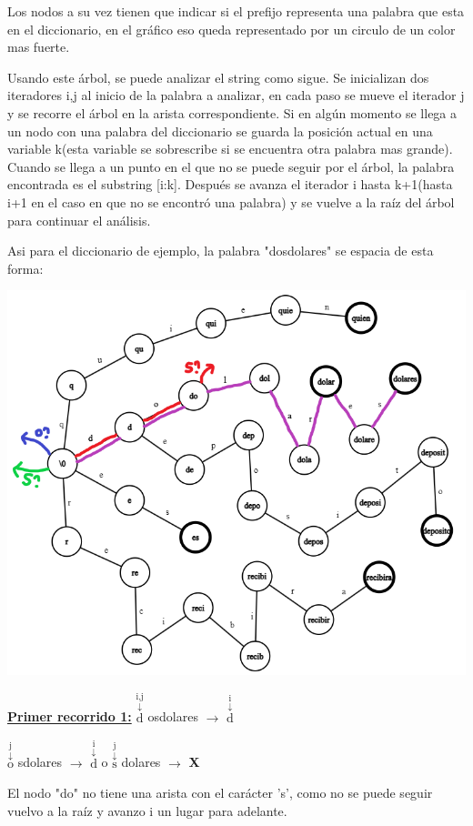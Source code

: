 \documentclass{article}
\newcommand{\flecha}[2] {
    \!\!$\overset{\text{#1}}{\overset{\downarrow}{\text{#2}}}$\!\!
}
\begin{document}
Los nodos a su vez tienen que indicar si el prefijo representa una palabra que esta en el diccionario, en el gráfico
eso queda representado por un circulo de un color mas fuerte.

Usando este árbol, se puede analizar el string como sigue. Se inicializan dos iteradores i,j al inicio de la palabra a analizar,
en cada paso se mueve el iterador j y se recorre el árbol en la arista correspondiente. Si en algún momento se llega a un nodo
con una palabra del diccionario se guarda la posición actual en una variable k(esta variable se sobrescribe si se encuentra otra
palabra mas grande). Cuando se llega a un punto en el que no se puede seguir por el árbol, la palabra encontrada es el substring
[i:k]. Después se avanza el iterador i hasta k+1(hasta i+1 en el caso en que no se encontró una palabra) y se vuelve a la raíz del 
árbol para continuar el análisis.

Asi para el diccionario de ejemplo, la palabra "dosdolares" se espacia de esta forma:

\begin{center}
\includegraphics[scale=0.4]{ejemplo_trie1.png}
\end{center}

{\color{red} \underline{\textbf{Primer recorrido 1:}}} \flecha{i,j}{d}osdolares $\rightarrow$ \flecha{i}d\flecha{j}osdolares $\rightarrow$ \flecha{i}do\flecha{j}sdolares $\rightarrow$ {\color{red} \textbf X}

El nodo "do" no tiene una arista con el carácter 's', como no se puede seguir vuelvo a la raíz y avanzo i un lugar para adelante.
\end{document}
